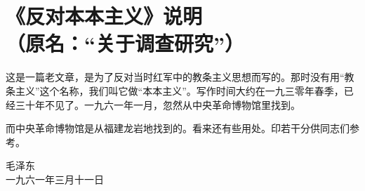 \section[《反对本本主义》说明（一九六一年三月十一日）]{《反对本本主义》说明\\{\large（原名：“关于调查研究”）}}

这是一篇老文章，是为了反对当时红军中的教条主义思想而写的。那时没有用“教条主义”这个名称，我们叫它做“本本主义”。写作时间大约在一九三零年春季，已经三十年不见了。一九六一年一月，忽然从中央革命博物馆里找到。

而中央革命博物馆是从福建龙岩地找到的。看来还有些用处。印若干分供同志们参考。

{\raggedleft 毛泽东\\一九六一年三月十一日\par}


